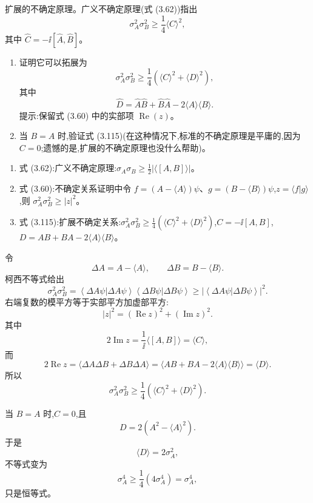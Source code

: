 \begin{question}
扩展的不确定原理。广义不确定原理(式 (3.62))指出
\[
\sigma_A^2\sigma_B^2\geq \frac14\langle C\rangle^2,
\]
其中 $\hat C=-\ii[\hat A,\hat B]$。
\begin{enumerate}
\item 证明它可以拓展为
\[
\sigma_A^2\sigma_B^2\geq \frac14\left(\langle C\rangle^2+\langle D\rangle^2\right),\tag{3.115}
\]
其中
\[
\hat D=\hat A\hat B+\hat B\hat A-2\langle A\rangle\langle B\rangle.
\]
提示:保留式 (3.60) 中的实部项 $\operatorname{Re}(z)$。
\item 当 $B=A$ 时,验证式 (3.115)(在这种情况下,标准的不确定原理是平庸的,因为 $C=0$;遗憾的是,扩展的不确定原理也没什么帮助)。
\end{enumerate}

\par\smallskip
{}
\begin{enumerate}[leftmargin=2.2em,itemsep=0.12em,topsep=0.12em,parsep=0pt]
\item 式 (3.62):广义不确定原理:$\sigma_A\sigma_B\ge \frac12|\langle[A,B]\rangle|$。
\item 式 (3.60):不确定关系证明中令 $f=(A-\langle A\rangle)\psi$、$g=(B-\langle B\rangle)\psi$,$z=\langle f|g\rangle$,则 $\sigma_A^2\sigma_B^2\ge |z|^2$。
\item 式 (3.115):扩展不确定关系:$\sigma_A^2\sigma_B^2\ge\frac14(\langle C\rangle^2+\langle D\rangle^2)$,$C=-\ii[A,B]$,$D=AB+BA-2\langle A\rangle\langle B\rangle$。
\end{enumerate}

\end{question}
\begin{solution}
令
\[
\Delta A=A-\langle A\rangle,
\qquad
\Delta B=B-\langle B\rangle.
\]
柯西不等式给出
\[
\sigma_A^2\sigma_B^2
=\left\langle \Delta A\psi|\Delta A\psi \right\rangle\left\langle \Delta B\psi|\Delta B\psi \right\rangle
\ge |\left\langle \Delta A\psi|\Delta B\psi \right\rangle|^2.
\]
右端复数的模平方等于实部平方加虚部平方:
\[
|z|^2=(\operatorname{Re}z)^2+(\operatorname{Im}z)^2.
\]
其中
\[
2\operatorname{Im}z=\frac1\ii\langle[A,B]\rangle=\langle C\rangle,
\]
而
\[
2\operatorname{Re}z
=\langle\Delta A\Delta B+\Delta B\Delta A\rangle
=\langle AB+BA-2\langle A\rangle\langle B\rangle\rangle
=\langle D\rangle.
\]
所以
\[
\boxed{\sigma_A^2\sigma_B^2\ge
\frac14\left(\langle C\rangle^2+\langle D\rangle^2\right).}
\]

当 $B=A$ 时,$C=0$,且
\[
D=2(A^2-\langle A\rangle^2).
\]
于是
\[
\langle D\rangle=2\sigma_A^2,
\]
不等式变为
\[
\sigma_A^4\ge \frac14(4\sigma_A^4)=\sigma_A^4,
\]
只是恒等式。
\end{solution}

